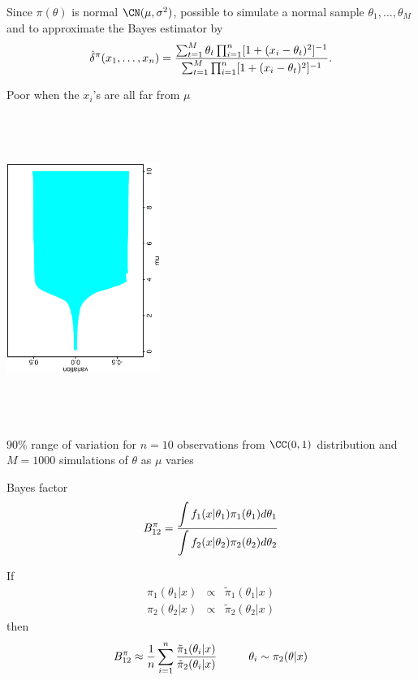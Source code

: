 \begin{slide}
\pause
Since $\pi(\theta)$ is normal $\CN(\mu, \sigma^2)$, possible 
to simulate a normal sample $\theta_1,\ldots,\allowbreak\theta_M$ 
and to approximate the Bayes estimator by
\[
\hat\delta^\pi(x_1,\ldots,x_n) =
{\sum_{t=1}^M \theta_t \prod_{i=1}^n [1+(x_i-\theta_t)^2]^{-1} \over 
\sum_{t=1}^M \prod_{i=1}^n [1+(x_i-\theta_t)^2]^{-1}}.
\]
\fin

\end{slide}\begin{slide}

Poor when the $x_i$'s are all far from $\mu$

\centerline{\includegraphics[height=10cm,angle=270,width=5cm]{figures/fig622.ps}}
$90\%$ range of variation 
for $n=10$ observations from $\CC (0,1)$ distribution and $M=1000$
simulations of $\theta$ as $\mu$ varies
\fin

\end{slide}\begin{slide}
Bayes factor
$$
B^\pi_{12} = { \displaystyle{\int f_1(x|\theta_1) \pi_1(\theta_1) d\theta_1} \over
\displaystyle{\int f_2(x|\theta_2) \pi_2(\theta_2) d\theta_2} }
$$

\pause
If
$$
\begin{array}{lll}
\pi_1(\theta_1|x) &\propto& {\tilde\pi}_1(\theta_1|x) \\
\pi_2(\theta_2|x) &\propto& {\tilde\pi}_2(\theta_2|x) 
\end{array}          
$$
then
$$
B^\pi_{12} \approx {1\over n} \sum_{i=1}^n { {\tilde\pi}_1(\theta_i|x) \over
            {\tilde\pi}_2(\theta_i|x) }  \hspace{1cm}  \theta_i \sim \pi_2(\theta|x)
$$

\end{slide}
